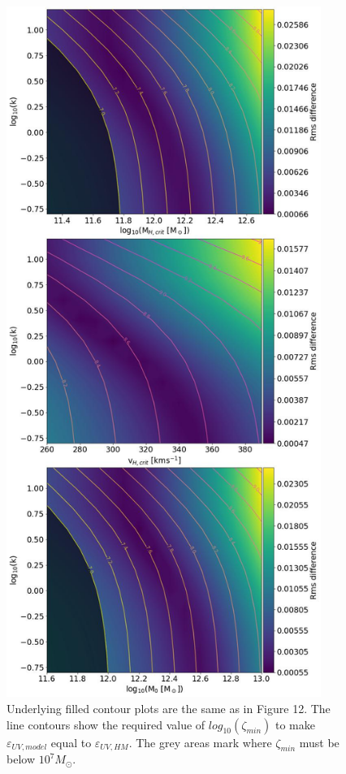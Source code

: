 \documentclass[12pt, twocolumn]{article}%
\begin{document}
\begin{figure}[H]
\centering
\includegraphics[width=10.25cm]{Plot_11_2.jpeg}
\caption{Underlying filled contour plots are the same as in Figure 12. The line contours show the required value of $log_{10}(\zeta_{min})$ to make $\varepsilon_{UV,model}$ equal to $\varepsilon_{UV,HM}$. The grey areas mark where $\zeta_{min}$ must be below $10^7M_\odot$.}
\label{fig:13}
\end{figure}
\clearpage
\twocolumngrid
\end{document}
